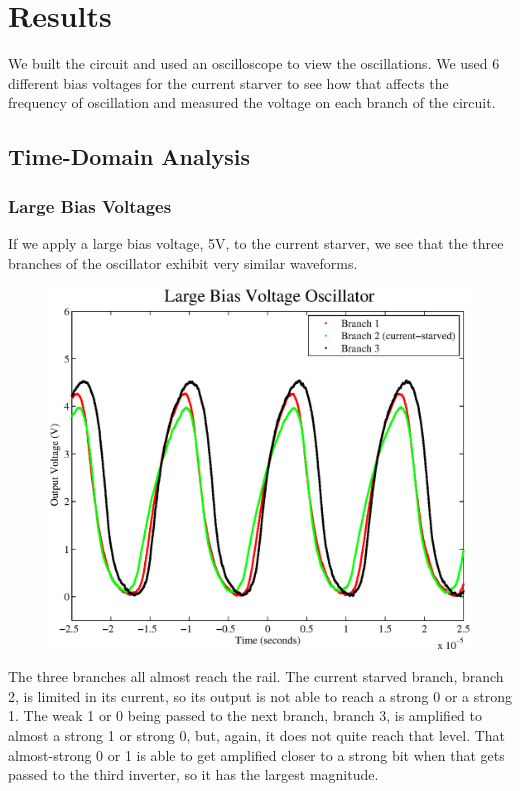 \documentclass{article}
\begin{document}
\section{Results}

We built the circuit and used an oscilloscope to view the oscillations.  We used 6 different bias voltages for the current starver to see how that affects the frequency of oscillation and measured the voltage on each branch of the circuit.

\subsection*{Time-Domain Analysis}

\subsubsection*{Large Bias Voltages}

If we apply a large bias voltage, 5V, to the current starver, we see that the three branches of the oscillator exhibit very similar waveforms.

\begin{figure}[H]
\centering
\includegraphics[scale=.6]{large_bias.eps}
\caption{}
\label{largeBias}
\end{figure}

The three branches all almost reach the rail.  The current starved branch, branch 2, is limited in its current, so its output is not able to reach a strong 0 or a strong 1.  The weak 1 or 0 being passed to the next branch, branch 3, is amplified to almost a strong 1 or strong 0, but, again, it does not quite reach that level.  That almost-strong 0 or 1 is able to get amplified closer to a strong bit when that gets passed to the third inverter, so it has the largest magnitude.
\end{document}
